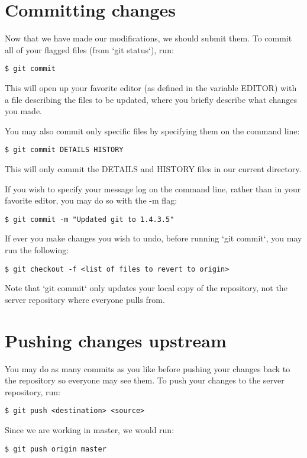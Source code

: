 \documentclass[a4paper,10pt]{book}
\begin{document}
\section{Committing changes}
Now that we have made our modifications, we should submit them. To commit
all of your flagged files (from `git status`), run:
\begin{verbatim}
$ git commit
\end{verbatim}

This will open up your favorite editor (as defined in the variable EDITOR)
with a file describing the files to be updated, where you briefly describe
what changes you made.

You may also commit only specific files by specifying them on the command
line:
\begin{verbatim}
$ git commit DETAILS HISTORY
\end{verbatim}

This will only commit the DETAILS and HISTORY files in our current
directory.

If you wish to specify your message log on the command line, rather than in
your favorite editor, you may do so with the -m flag:
\begin{verbatim}
$ git commit -m "Updated git to 1.4.3.5"
\end{verbatim}

If ever you make changes you wish to undo, before running `git commit`, you
may run the following:
\begin{verbatim}
$ git checkout -f <list of files to revert to origin>
\end{verbatim}

Note that `git commit` only updates your local copy of the repository, not
the server repository where everyone pulls from.
\section{Pushing changes upstream}
You may do as many commits as you like before pushing your changes back to
the repository so everyone may see them. To push your changes to the server
repository, run:
\begin{verbatim}
$ git push <destination> <source>
\end{verbatim}

Since we are working in master, we would run:
\begin{verbatim}
$ git push origin master
\end{verbatim}
\end{document}
